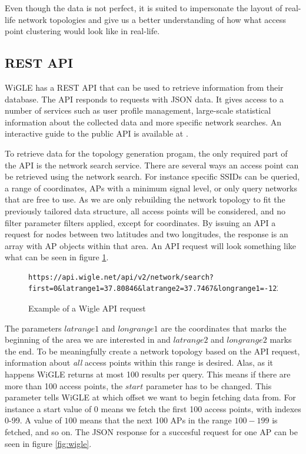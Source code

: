 	Even though the data is not perfect, it is suited to impersonate the layout of real-life network topologies and give us a better understanding of how what access point
	clustering would look like in real-life. 

	\subsection{REST API}
	WiGLE has a REST API that can be used to retrieve information from their database. The API responds to requests with JSON data. It gives access to a
	number of services such as user profile management, large-scale statistical information about the collected data
	and more specific network searches. An interactive guide to the public API is available at \cite{WigleAPI}. 

	To retrieve data for the topology generation progam, the only required part of the API is the network search service. There are several ways an access point can be retrieved using
	the network search. For instance specific SSIDs can be queried, a range of coordinates, APs with a minimum signal level, or only query networks that are free to use. As 
	we are only rebuilding the network topology to fit the previously tailored data structure, all access points will be considered, and no filter parameter filters applied, except for coordinates.
	By issuing an API a request for nodes between two latitudes and two longitudes, the response is an array with AP objects within that area.  
	An API request will look something like what can be seen in figure \ref{fig:wigReq}.
	\begin{figure}
	\scriptsize
	\begin{lstlisting}[breaklines]
	 https://api.wigle.net/api/v2/network/search?first=0&latrange1=37.80846&latrange2=37.7467&longrange1=-122.5392&longrange2=-122.3813&start=0
	\end{lstlisting}
	\caption{Example of a Wigle API request}
	\label{fig:wigReq}
	\end{figure}

	The parameters $latrange1$ and $longrange1$ are the coordinates that marks the beginning of the area we are interested in and $latrange2$ and $longrange2$ marks the end. 
	To be meaningfully create a network topology based on the API request, information about \textit{all} access points within this range is desired. Alas, as it happens
	WiGLE returns at most 100 results per query. This means if there are more than 100 access points, the $start$
	parameter has to be changed. This parameter tells WiGLE at which offset we want to begin fetching data from. For instance a start value of $0$ means we fetch the first 100 access points, with indexes 0-99. A value of $100$ means that the next 100 APs in the range $100-199$ is fetched, and so on. The JSON response for a succesful request for one AP can be seen in figure \ref{fig:wigle}. 

